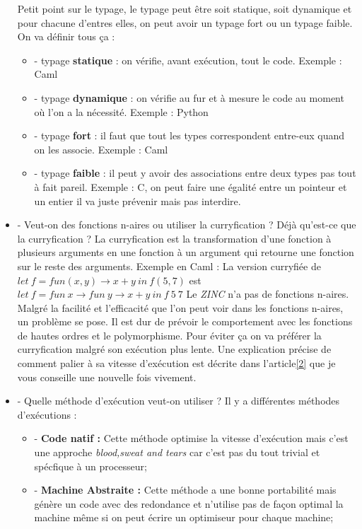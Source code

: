 \documentclass[10pt,a4paper]{article}
\begin{document}
\begin{itemize}
					Petit point sur le typage, le typage peut être soit statique, soit dynamique et pour chacune d'entres elles, on peut avoir un typage fort ou un typage faible. On va définir tous ça :
					\begin{itemize}
						\item[] - typage \textbf{statique} : on vérifie, avant exécution, tout le code. Exemple : Caml
						\item[] - typage \textbf{dynamique} : on vérifie au fur et à mesure le code au moment où l'on a la nécessité. Exemple : Python
						\item[] - typage \textbf{fort} : il faut que tout les types correspondent entre-eux quand on les associe. Exemple : Caml 
						\item[] - typage \textbf{faible} : il peut y avoir des associations entre deux types pas tout à fait pareil. Exemple : C, on peut faire une égalité entre un pointeur et un entier il va juste prévenir mais pas interdire. 
					\end{itemize} 
					\item[] - Veut-on des fonctions n-aires ou utiliser la curryfication ? Déjà qu'est-ce que la curryfication ? La curryfication est la transformation d'une fonction à plusieurs arguments en une fonction à un argument qui retourne une fonction sur le reste des arguments.
					\smallbreak
					Exemple en Caml : La version curryfiée de $let~f = fun(x,y) \rightarrow x+y~in~f(5,7)$ est\\ $let~f = fun~x \rightarrow fun~y \rightarrow x+y~in~f~5~7$ 
					\smallbreak
					Le \textit{ZINC} n'a pas de fonctions n-aires. Malgré la facilité et l'efficacité que l'on peut voir dans les fonctions n-aires, un problème se pose. Il est dur de prévoir le comportement avec les fonctions de hautes ordres et le polymorphisme. Pour éviter ça on va préférer la curryfication malgré son exécution plus lente. Une explication précise de comment palier à sa vitesse d'exécution est décrite dans l'article\hyperref[ZINC]{[2]} que je vous conseille une nouvelle fois vivement.
					\item[] - Quelle méthode d'exécution veut-on utiliser ? Il y a différentes méthodes d'exécutions :
					\begin{itemize}
						\item[] - \textbf{Code natif :} Cette méthode optimise la vitesse d'exécution mais c'est une approche \textit{blood,sweat and tears} car c'est pas du tout trivial et spécfique à un processeur;
						\item[] - \textbf{Machine Abstraite :} Cette méthode a une bonne portabilité mais génère un code avec des redondance et n'utilise pas de façon optimal la machine même si on peut écrire un optimiseur pour chaque machine;

\end{itemize}
\end{itemize}
\end{document}
